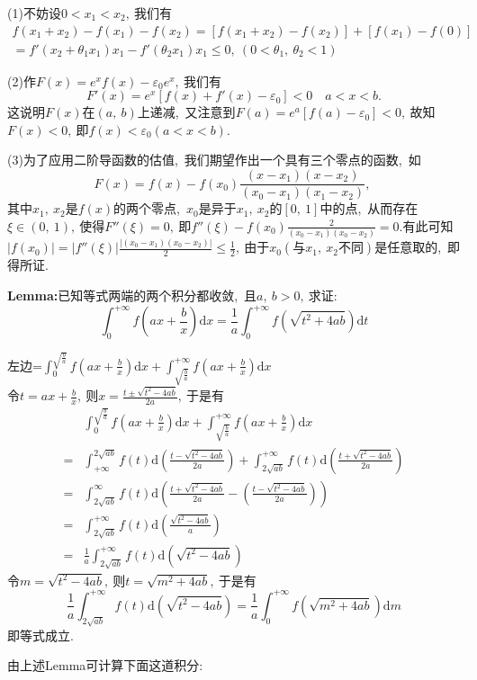 	\begin{solution}
		(1)不妨设$0<x_1<x_2,\ $我们有
		$$\begin{array}{l}
			f(x_1+x_2)-f(x_1)-f(x_2)=[f(x_1+x_2)-f(x_2)]+[f(x_1)-f(0)]\\
			=f'(x_2+\theta_1x_1)x_1-f'(\theta_2x_1)x_1\le 0,\ (0<\theta_1,\ \theta_2<1)
		\end{array} $$
		
		(2)作$F(x)=e^x f(x)-\varepsilon_0e^x,\ $我们有
		$$F'(x)=e^x[f(x) + f'(x) - \varepsilon_0]<0 \quad a < x < b.$$
		这说明$F(x)$在$(a,\ b)$上递减,\ 又注意到$F(a)=e^a[f(a)-\varepsilon_0]<0,\ $故知$F(x)<0,\ $即$f(x)<\varepsilon_0(a<x<b).$
		
		(3)为了应用二阶导函数的估值,\ 我们期望作出一个具有三个零点的函数,\ 如
		$$F(x)=f(x)-f(x_0)\frac{(x-x_1)(x-x_2)}{(x_0-x_1)(x_1-x_2)},\ $$
		其中$x_1,\ x_2$是$f(x)$的两个零点,\ $x_0$是异于$x_1,\ x_2$的$\left[0,\ 1\right]$中的点,\ 从而存在$\xi \in \left(0,\ 1\right),\ $使得$F''(\xi)=0,\ $即$f''(\xi)-f(x_0)\frac{2}{(x_0-x_1)(x_0-x_2)}=0.$有此可知$|f(x_0)|=|f''(\xi)|\frac{|(x_0-x_1)(x_0-x_2)|}{2}\le \frac{1}{2},\ $由于$x_0$$\left(\text{与}x_1,\ x_2\text{不同} \right)$是任意取的,\ 即得所证. 
	\end{solution}
	
	\newpage
	\begin{problem}
		\textbf{Lemma:}已知等式两端的两个积分都收敛,\ 且$a,\ b>0,\ $求证:
		$$\int_{0}^{+\infty}f\left(ax+\frac{b}{x}\right)\text{d}x=\frac{1}{a}\int_{0}^{+\infty}f\left(\sqrt{t^2+4ab}\right)\text{d}t$$
	\end{problem}
	
	\begin{solution}
		左边=$\int_{0}^{\sqrt{\frac{b}{a}}}f\left(ax+\frac{b}{x}\right)\text{d}x+\int_{\sqrt{\frac{b}{a}}}^{+\infty}f\left(ax+\frac{b}{x}\right)\text{d}x$\\
		令$t = ax+\frac{b}{x},\ $则$x = \frac{t\pm\sqrt{t^2-4ab}}{2a},\ $于是有
		\begin{align*}
			&\int_{0}^{\sqrt{\frac{b}{a}}}f\left(ax+\frac{b}{x}\right)\text{d}x+\int_{\sqrt{\frac{b}{a}}}^{+\infty}f\left(ax+\frac{b}{x}\right)\text{d}x\\
			=&\int_{+\infty}^{2\sqrt{ab}}f(t)\text{d}\left(\frac{t-\sqrt{t^2-4ab}}{2a}\right)+\int_{2\sqrt{ab}}^{+\infty}f(t)\text{d}\left(\frac{t+\sqrt{t^2-4ab}}{2a}\right)\\
			=&\int_{2\sqrt{ab}}^{\infty}f(t)\text{d}\left(\frac{t+\sqrt{t^2-4ab}}{2a}-\left(\frac{t-\sqrt{t^2-4ab}}{2a}\right)\right)\\
			=&\int_{2\sqrt{ab}}^{+\infty}f(t)\text{d}\left(\frac{\sqrt{t^2-4ab}}{a}\right)\\
			=&\frac{1}{a}\int_{2\sqrt{ab}}^{+\infty}f(t)\text{d}\left(\sqrt{t^2-4ab}\right)
		\end{align*}
		令$m=\sqrt{t^2-4ab},\ $则$t=\sqrt{m^2+4ab},\ $于是有
		$$\frac{1}{a}\int_{2\sqrt{ab}}^{+\infty}f(t)\text{d}\left(\sqrt{t^2-4ab}\right)=\frac{1}{a}\int_{0}^{+\infty}f\left(\sqrt{m^2+4ab}\right)\text{d}m$$
		即等式成立. 
	\end{solution}
	\newpage
	由上述Lemma可计算下面这道积分:
	\\
	
